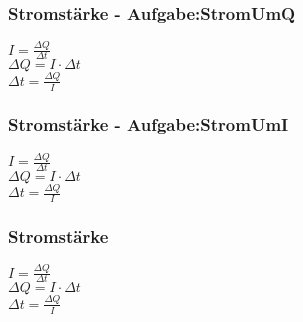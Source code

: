 \subsubsection{Stromstärke - Aufgabe:StromUmQ} 
\begin{minipage}{0.45\textwidth} 
$ I = \frac{\Delta Q}{\Delta t} $\\ 
$ \Delta Q =I\cdot \Delta t $\\ 
$ \Delta t = \frac{\Delta Q}{I} $\\ 
\end{minipage} 
\begin{minipage}{0.45\textwidth} 
 
\end{minipage} 
\subsubsection{Stromstärke - Aufgabe:StromUmI} 
\begin{minipage}{0.45\textwidth} 
$ I = \frac{\Delta Q}{\Delta t} $\\ 
$ \Delta Q =I\cdot \Delta t $\\ 
$ \Delta t = \frac{\Delta Q}{I} $\\ 
\end{minipage} 
\begin{minipage}{0.45\textwidth} 
 
\end{minipage} 
\subsubsection{Stromstärke} 
\begin{minipage}{0.45\textwidth} 
$ I = \frac{\Delta Q}{\Delta t} $\\ 
$ \Delta Q =I\cdot \Delta t $\\ 
$ \Delta t = \frac{\Delta Q}{I} $\\ 
\end{minipage} 
\begin{minipage}{0.45\textwidth} 
 
\end{minipage} 

